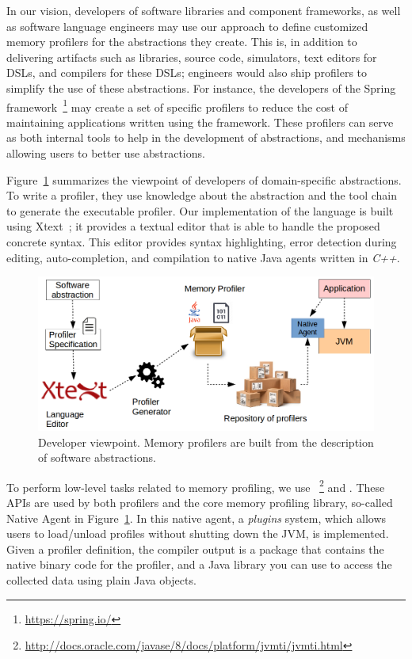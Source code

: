
In our vision, developers of software libraries and component frameworks, as well as software language engineers may use our approach to  define customized memory profilers for the abstractions they create.
This is, in addition to delivering artifacts such as libraries, source code, simulators, text editors for DSLs, and compilers for these DSLs; engineers would also ship profilers to simplify the use of these abstractions.
For instance, the developers of the Spring framework~\footnote{\url{https://spring.io/}} may create a set of specific profilers to reduce the cost of maintaining applications written using the framework.
These profilers can serve as both internal tools to help in the development of abstractions, and mechanisms allowing users to better use abstractions.

Figure~\ref{fig:dsl-tooling-developer} summarizes the viewpoint of developers of domain-specific abstractions.
To write a profiler, they use knowledge about the abstraction and the tool chain to generate the executable profiler. 
Our implementation of the language is built using Xtext~\cite{Eysholdt:2010:XIY:1869542.1869625}; it provides a textual editor that is able to handle the proposed concrete syntax.
This editor provides syntax highlighting, error detection during editing, auto-completion, and compilation to native Java agents written in \textit{C++}.

\begin{figure}
\centering
\includegraphics[scale=0.45]{./chapter6/fig/developer-profiler-view.png}
\caption{Developer viewpoint. Memory profilers are built from the description of software abstractions.}\label{fig:dsl-tooling-developer}
\end{figure}

To perform low-level tasks related to memory profiling, we use ~\footnote{\url{http://docs.oracle.com/javase/8/docs/platform/jvmti/jvmti.html}} and .
These APIs are used by both profilers and the core memory profiling library, so-called Native Agent in Figure~\ref{fig:dsl-tooling-developer}.
In this native agent, a \textit{plugins} system, which allows users to load/unload profiles without shutting down the JVM, is implemented.
Given a profiler definition, the compiler output is a package that contains the native binary code for the profiler, and a Java library you can use to access the collected data using plain Java objects.


